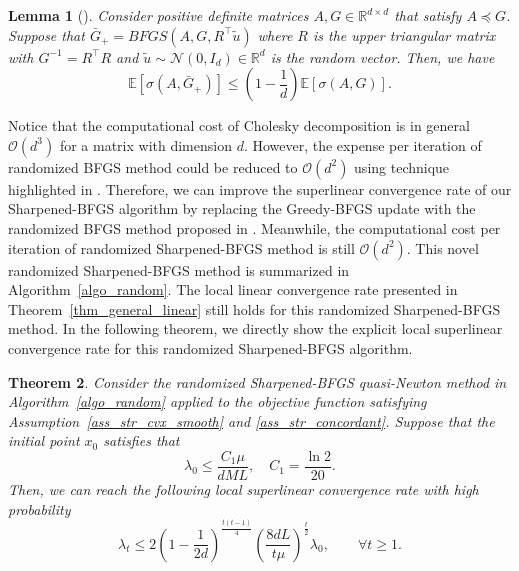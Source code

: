 \documentclass[11pt]{article}
\numberwithin{assumption}{section}
\numberwithin{remark}{section}
\newtheorem{theorem}{Theorem}
\numberwithin{theorem}{section}
\newtheorem{lemma}[theorem]{Lemma}
\begin{document}
\begin{lemma}[\cite{zhangzhihua2021quasinewton1}]\label{lemma_BFGS_random}
Consider positive definite matrices $A, G \in \mathbb{R}^{d \times d}$ that satisfy $A \preceq G$. Suppose that $\bar{G}_{+} = BFGS(A, G, R^\top\tilde{u})$ where $R$ is the upper triangular matrix with $G^{-1} = R^\top R$ and $\tilde{u} \sim \mathcal{N}(0, I_d) \in \mathbb{R}^d$ is the random vector. Then, we have
\begin{equation}\label{lemma_BFGS_random_1}
    \mathbb{E}\left[\sigma(A, \bar{G}_{+})\right] \leq \left(1 - \frac{1}{d}\right)\mathbb{E}\left[\sigma(A, G)\right].
\end{equation}
\end{lemma}

Notice that the computational cost of Cholesky decomposition is in general $\mathcal{O}(d^3)$ for a matrix with dimension $d$. However, the expense per iteration of randomized BFGS method could be reduced to $\mathcal{O}(d^2)$ using technique highlighted in \cite{zhangzhihua2021quasinewton1}. Therefore, we can improve the superlinear convergence rate of our Sharpened-BFGS algorithm by replacing the Greedy-BFGS update with the randomized BFGS method proposed in \cite{zhangzhihua2021quasinewton1}. Meanwhile, the computational cost per iteration of randomized Sharpened-BFGS method is still $\mathcal{O}(d^2)$. This novel randomized Sharpened-BFGS method is summarized in Algorithm~\ref{algo_random}. The local linear convergence rate presented in Theorem~\ref{thm_general_linear} still holds for this randomized Sharpened-BFGS method. In the following theorem, we directly show the explicit local superlinear convergence rate for this randomized Sharpened-BFGS algorithm.

\begin{theorem}\label{thm_random}
Consider the randomized Sharpened-BFGS quasi-Newton method in Algorithm~\ref{algo_random} applied to the objective function satisfying Assumption~\ref{ass_str_cvx_smooth} and \ref{ass_str_concordant}. Suppose that the initial point $x_0$ satisfies that
\begin{equation}\label{thm_random_1}
\lambda_0 \leq \frac{C_1\mu}{dML}, \quad C_1 = \frac{\ln{2}}{20}.
\end{equation}
Then, we can reach the following local superlinear convergence rate with high probability
\begin{equation}\label{thm_random_2}
    \lambda_t \leq 2(1 - \frac{1}{2d})^{\frac{t(t - 1)}{4}} (\frac{8dL}{t\mu})^{\frac{t}{2}}\lambda_0, \qquad \forall t \geq 1.
\end{equation}
\end{theorem}
\end{document}
